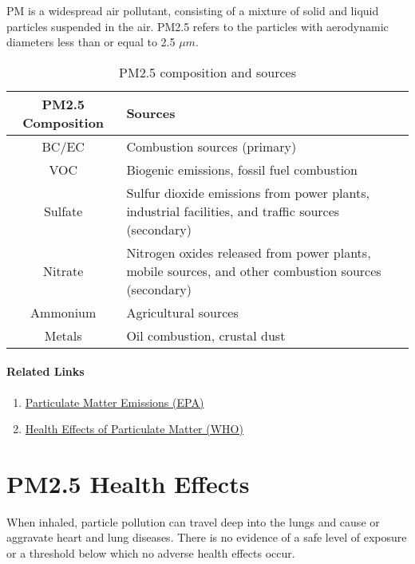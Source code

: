\documentclass[11pt]{article}
\begin{document}
PM is a widespread air pollutant, consisting of a mixture of solid and liquid particles suspended in the air. PM2.5 refers to the particles with aerodynamic diameters less than or equal to 2.5 $\mu m$.

\begin{table}[H]
    \centering
    \begin{tabular}{|c|p{}|}
        \hline
        \textbf{PM2.5 Composition} & \textbf{Sources}  \\
        \hline
        BC/EC & Combustion sources (primary) \\
        \hline
        VOC & Biogenic emissions, fossil fuel combustion \\
        \hline
        Sulfate &  Sulfur dioxide emissions from power plants, industrial facilities, and traffic sources (secondary) \\
        \hline
        Nitrate & Nitrogen oxides released from power plants, mobile sources, and other combustion sources (secondary) \\
        \hline
        Ammonium & Agricultural sources \\
        \hline 
        Metals &  Oil combustion, crustal dust \\
        \hline
    \end{tabular}
    \caption{PM2.5 composition and sources}
    \label{tab:com}
\end{table}

\paragraph{Related Links}

\begin{enumerate}
    \item \href{https://cfpub.epa.gov/roe/indicator_pdf.cfm?i=19}{Particulate Matter Emissions (EPA)}
     \item \href{http://www.euro.who.int/__data/assets/pdf_file/0006/189051/Health-effects-of-particulate-matter-final-Eng.pdf}{Health Effects of Particulate Matter (WHO)}
\end{enumerate}

\section{PM2.5 Health Effects}

When inhaled, particle pollution can travel deep into the lungs and cause or aggravate heart and lung diseases. There is no evidence of a safe level of exposure or a threshold below which no adverse health effects occur.
\end{document}
